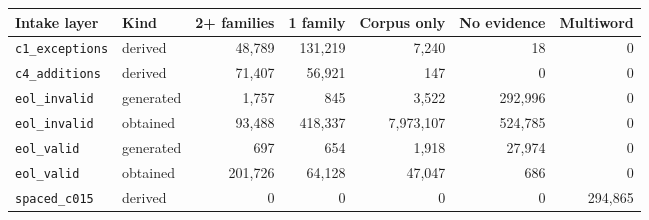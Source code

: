 \begin{tabular}{llrrrrr}
\toprule
Intake layer & Kind & 2+ families & 1 family & Corpus only & No evidence & Multiword \\
\midrule
\texttt{c1\_exceptions} & derived & 48,789 & 131,219 & 7,240 & 18 & 0 \\
\texttt{c4\_additions} & derived & 71,407 & 56,921 & 147 & 0 & 0 \\
\texttt{eol\_invalid} & generated & 1,757 & 845 & 3,522 & 292,996 & 0 \\
\texttt{eol\_invalid} & obtained & 93,488 & 418,337 & 7,973,107 & 524,785 & 0 \\
\texttt{eol\_valid} & generated & 697 & 654 & 1,918 & 27,974 & 0 \\
\texttt{eol\_valid} & obtained & 201,726 & 64,128 & 47,047 & 686 & 0 \\
\texttt{spaced\_c015} & derived & 0 & 0 & 0 & 0 & 294,865 \\
\bottomrule
\end{tabular}
